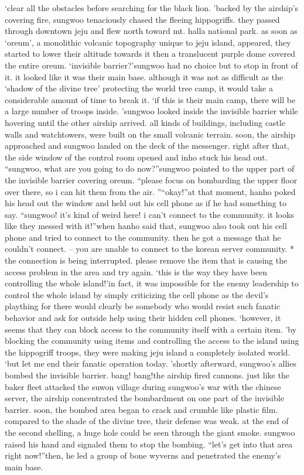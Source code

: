 ‘clear all the obstacles before searching for the black lion.
’backed by the airship’s covering fire, sungwoo tenaciously chased the fleeing hippogriffs.
 they passed through downtown jeju and flew north toward mt.
 halla national park.
as soon as ‘oreum’, a monolithic volcanic topography unique to jeju island, appeared, they started to lower their altitude towards it then a translucent purple dome covered the entire oreum.
‘invisible barrier?’sungwoo had no choice but to stop in front of it.
 it looked like it was their main base.
although it was not as difficult as the ‘shadow of the divine tree’ protecting the world tree camp, it would take a considerable amount of time to break it.
‘if this is their main camp, there will be a large number of troops inside.
’sungwoo looked inside the invisible barrier while hovering until the other airship arrived.
all kinds of buildings, including castle walls and watchtowers, were built on the small volcanic terrain.
soon, the airship approached and sungwoo landed on the deck of the messenger.
right after that, the side window of the control room opened and inho stuck his head out.
“sungwoo, what are you going to do now?”sungwoo pointed to the upper part of the invisible barrier covering oreum.
“please focus on bombarding the upper floor over there, so i can hit them from the air.
”“okay!”at that moment, hanho poked his head out the window and held out his cell phone as if he had something to say.
“sungwoo! it’s kind of weird here! i can’t connect to the community.
 it looks like they messed with it!”when hanho said that, sungwoo also took out his cell phone and tried to connect to the community.
 then he got a message that he couldn’t connect.
– you are unable to connect to the korean server community.
* the connection is being interrupted.
 please remove the item that is causing the access problem in the area and try again.
‘this is the way they have been controlling the whole island!’in fact, it was impossible for the enemy leadership to control the whole island by simply criticizing the cell phone as the devil’s plaything for there would clearly be somebody who would resist such fanatic behavior and ask for outside help using their hidden cell phones.
‘however, it seems that they can block access to the community itself with a certain item.
’by blocking the community using items and controlling the access to the island using the hippogriff troops, they were making jeju island a completely isolated world.
‘but let me end their fanatic operation today.
’shortly afterward, sungwoo’s allies bombed the invisible barrier.
bang! bang!the airship fired cannons.
 just like the baker fleet attacked the suwon village during sungwoo’s war with the chinese server, the airship concentrated the bombardment on one part of the invisible barrier.
soon, the bombed area began to crack and crumble like plastic film.
 compared to the shade of the divine tree, their defense was weak.
at the end of the second shelling, a huge hole could be seen through the giant smoke.
sungwoo raised his hand and signaled them to stop the bombing.
“let’s get into that area right now!”then, he led a group of bone wyverns and penetrated the enemy’s main base.


